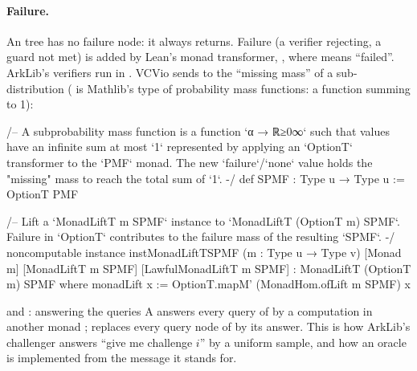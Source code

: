 
\paragraph{Failure.} An  tree has no failure node: it always returns. Failure (a
verifier rejecting, a guard not met) is added by Lean's  monad transformer,
, where  means \enquote{failed}. ArkLib's verifiers
run in . VCVio sends  to the \enquote{missing mass}
of a sub-distribution ( is Mathlib's type of probability mass functions: a function
 summing to 1):

\begin{leancode}
/-- A subprobability mass function is a function `α → ℝ≥0∞` such that values have an infinite
sum at most `1` represented by applying an `OptionT` transformer to the `PMF` monad.
The new `failure`/`none` value holds the "missing" mass to reach the total sum of `1`. -/
def SPMF : Type u → Type u := OptionT PMF
\end{leancode}



\begin{leancode}
/-- Lift a `MonadLiftT m SPMF` instance to `MonadLiftT (OptionT m) SPMF`. Failure in `OptionT`
contributes to the failure mass of the resulting `SPMF`. -/
noncomputable instance instMonadLiftTSPMF (m : Type u → Type v) [Monad m]
    [MonadLiftT m SPMF] [LawfulMonadLiftT m SPMF] :
    MonadLiftT (OptionT m) SPMF where
  monadLift x := OptionT.mapM' (MonadHom.ofLift m SPMF) x
\end{leancode}


\begin{define}{ and : answering the queries}
A  answers every query of  by a computation in another monad
;  replaces every query node of  by its answer. This is
how ArkLib's challenger answers \enquote{give me challenge $i$} by a uniform sample, and how an
oracle is implemented from the message it stands for.
\end{define}

